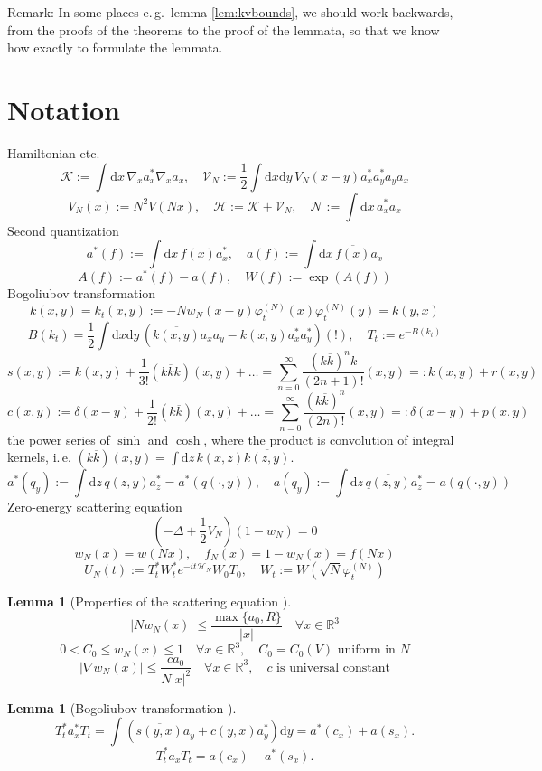 \documentclass[11pt,a4paper,twoside,headsepline]{scrartcl}
\newtheorem{lem}[thm]{Lemma}
\newcommand{\di}{\textrm{d}}		%
\newcommand{\Ncal}{\mathcal{N}}		%
\newcommand{\Kcal}{\mathcal{K}}		%
\newcommand{\Vcal}{\mathcal{V}}		%
\newcommand{\Hcal}{\mathcal{H}}		%
\newcommand{\cc}[1]{\overline{#1}}	%
\newcommand{\Rbb}{\mathbb{R}}		%
\newcommand{\ph}{\varphi_t^{(N)}}	%
\newcommand{\sqn}{\sqrt{N}}		%
\newcommand{\be}[1]{\begin{equation}\label{eq:#1}}	%
\newcommand{\ee}{\end{equation}}
\newcommand{\bd}{\begin{displaymath}}			%
\newcommand{\ed}{\end{displaymath}}
\begin{document}
Remark: In some places e.\,g.\ lemma \ref{lem:kvbounds}, we should work backwards, from the proofs of the theorems to the proof of the lemmata, so that we know how exactly to formulate the lemmata.

\section{Notation}
Hamiltonian etc.
\bd
\Kcal := \int \di x\, \nabla_x a^*_x \nabla_x a_x,
\quad
\Vcal_N := \frac{1}{2}\int\di x \di y\, V_N(x-y) a^*_x a^*_y a_y a_x
\ed
\bd
V_N(x) := N^2V(Nx), \quad \Hcal := \Kcal + \Vcal_N, \quad \Ncal := \int \di x\, a^*_x a_x
\ed
Second quantization
\bd
a^*(f) := \int \di x\, f(x) a^*_x, \quad a(f) := \int \di x\, \cc{f(x)} a_x
\ed
\bd
A(f) := a^*(f) - a(f), \quad W(f) := \exp(A(f))
\ed
Bogoliubov transformation
\bd
k(x,y) = k_t(x,y) := -N w_N(x-y) \ph(x) \ph(y) = k(y,x)
\ed
\bd
B(k_t) = \frac{1}{2}\int \di x \di y\, \left( \cc{k(x,y)} a_x a_y - k(x,y) a^*_x a^*_y\right) (!), \quad T_t := e^{-B(k_t)}
\ed
\bd
s(x,y) := k(x,y) + \frac{1}{3!}(k \cc k k)(x,y) + \dots = \sum_{n=0}^\infty \frac{(k \cc k)^n k}{(2n+1)!}(x,y) =: k(x,y) + r(x,y)
\ed
\bd
c(x,y) := \delta(x-y) + \frac{1}{2!}(k \cc k)(x,y) + \dots = \sum_{n=0}^\infty \frac{(k \cc k)^n}{(2n)!}(x,y) =: \delta(x-y) + p(x,y)
\ed
the power series of $\sinh$ and $\cosh$, where the product is convolution of integral kernels, i.\,e. $(k \cc k)(x,y) = \int \di z\, k(x,z) \cc{k(z,y)}$.
\bd
a^\ast(q_y) := \int \di z\, q(z,y) a^*_z = a^*(q(\cdot,y)) , \quad a(q_y) := \int \di z\, \cc{q(z,y)} a^*_z = a(q(\cdot,y))
\ed
Zero-energy scattering equation
\be{scatteringequation}
\left(-\Delta + \frac{1}{2}V_N \right)(1-w_N) = 0
\ee
\bd
w_N(x) = w(Nx), \quad f_N(x) = 1-w_N(x) = f(Nx)
\ed
\bd
U_N(t) := T^*_t W^*_t e^{- i t \Hcal_N} W_0 T_0,\quad W_t := W(\sqn \ph)
\ed

\begin{lem}[Properties of the scattering equation \cite{ESY2006}]
 \bd
\lvert N w_N(x)\rvert \leq \frac{\max\{a_0,R\}}{\lvert x\rvert}\quad \forall x \in \Rbb^3
\ed
\bd
0 < C_0 \leq w_N(x) \leq 1\quad \forall x \in \Rbb^3, \quad C_0 = C_0(V) \mbox{ uniform in } N
\ed
\bd
\lvert \nabla w_N(x) \rvert \leq \frac{c a_0}{N \lvert x\rvert^2}\quad \forall x \in \Rbb^3, \quad c \mbox { is universal constant}
\ed
\end{lem}

\begin{lem}[Bogoliubov transformation \cite{GMM2010}]
\label{lem:bogoliubovtransformation}
 \bd
 T_t^* a^*_x T_t = \int \left( \cc{s(y,x)} a_y + c(y,x) a^*_y \right) \di y = a^*(c_x) + a(s_x).
 \ed
\bd
 T_t^* a_x T_t = a(c_x) + a^*(s_x).
\ed
\end{lem}
\end{document}
